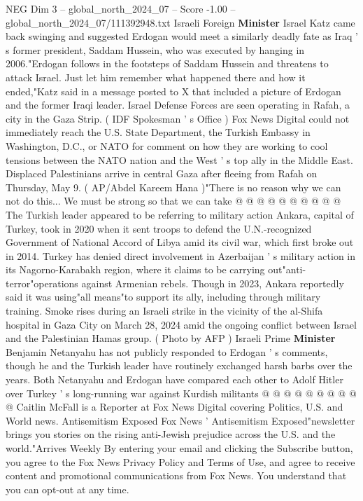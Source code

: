 \begin{textsample}{NEG Dim 3 – global\_north\_2024\_07 – Score -1.00 – global\_north\_2024\_07/111392948.txt}  \label{ex:f3_neg_375}
Israeli Foreign \textbf{Minister} Israel Katz came back swinging and suggested Erdogan would meet a similarly deadly fate as Iraq ' s former president, Saddam Hussein, who was executed by hanging in 2006."Erdogan follows in the footsteps of Saddam Hussein and threatens to attack Israel.
Just let him remember what happened there and how it ended,"Katz said in a message posted to X that included a picture of Erdogan and the former Iraqi leader.
Israel Defense Forces are seen operating in Rafah, a city in the Gaza Strip. ( IDF Spokesman ' s Office ) Fox News Digital could not immediately reach the U.S.
State Department, the Turkish Embassy in Washington, D.C., or NATO for comment on how they are working to cool tensions between the NATO nation and the West ' s top ally in the Middle East.
Displaced Palestinians arrive in central Gaza after fleeing from Rafah on Thursday, May 9. ( AP/Abdel Kareem Hana )"There is no reason why we can not do this...
We must be strong so that we can take @ @ @ @ @ @ @ @ @ @ The Turkish leader appeared to be referring to military action Ankara, capital of Turkey, took in 2020 when it sent troops to defend the U.N.-recognized Government of National Accord of Libya amid its civil war, which first broke out in 2014.
Turkey has denied direct involvement in Azerbaijan ' s military action in its Nagorno-Karabakh region, where it claims to be carrying out"anti-terror"operations against Armenian rebels.
Though in 2023, Ankara reportedly said it was using"all means"to support its ally, including through military training.
Smoke rises during an Israeli strike in the vicinity of the al-Shifa hospital in Gaza City on March 28, 2024 amid the ongoing conflict between Israel and the Palestinian Hamas group. ( Photo by AFP ) Israeli Prime \textbf{Minister} Benjamin Netanyahu has not publicly responded to Erdogan ' s comments, though he and the Turkish leader have routinely exchanged harsh barbs over the years.
Both Netanyahu and Erdogan have compared each other to Adolf Hitler over Turkey ' s long-running war against Kurdish militants @ @ @ @ @ @ @ @ @ @ Caitlin McFall is a Reporter at Fox News Digital covering Politics, U.S. and World news.
Antisemitism Exposed Fox News ' Antisemitism Exposed"newsletter brings you stories on the rising anti-Jewish prejudice across the U.S. and the world."Arrives Weekly By entering your email and clicking the Subscribe button, you agree to the Fox News Privacy Policy and Terms of Use, and agree to receive content and promotional communications from Fox News.
You understand that you can opt-out at any time.

\end{textsample}
